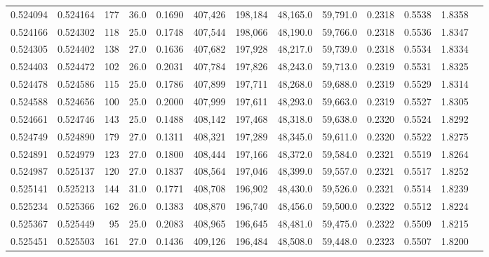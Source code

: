 \begin{tabular}{rrrrrrrrrrrrr}
0.524094 & 0.524164 &   177 & 36.0 &                                     0.1690 & 407,426 & 198,184 &  48,165.0 &  59,791.0 & 0.2318 & 0.5538 & 1.8358 \\
0.524166 & 0.524302 &   118 & 25.0 &                                     0.1748 & 407,544 & 198,066 &  48,190.0 &  59,766.0 & 0.2318 & 0.5536 & 1.8347 \\
0.524305 & 0.524402 &   138 & 27.0 &                                     0.1636 & 407,682 & 197,928 &  48,217.0 &  59,739.0 & 0.2318 & 0.5534 & 1.8334 \\
0.524403 & 0.524472 &   102 & 26.0 &                                     0.2031 & 407,784 & 197,826 &  48,243.0 &  59,713.0 & 0.2319 & 0.5531 & 1.8325 \\
0.524478 & 0.524586 &   115 & 25.0 &                                     0.1786 & 407,899 & 197,711 &  48,268.0 &  59,688.0 & 0.2319 & 0.5529 & 1.8314 \\
0.524588 & 0.524656 &   100 & 25.0 &                                     0.2000 & 407,999 & 197,611 &  48,293.0 &  59,663.0 & 0.2319 & 0.5527 & 1.8305 \\
0.524661 & 0.524746 &   143 & 25.0 &                                     0.1488 & 408,142 & 197,468 &  48,318.0 &  59,638.0 & 0.2320 & 0.5524 & 1.8292 \\
0.524749 & 0.524890 &   179 & 27.0 &                                     0.1311 & 408,321 & 197,289 &  48,345.0 &  59,611.0 & 0.2320 & 0.5522 & 1.8275 \\
0.524891 & 0.524979 &   123 & 27.0 &                                     0.1800 & 408,444 & 197,166 &  48,372.0 &  59,584.0 & 0.2321 & 0.5519 & 1.8264 \\
0.524987 & 0.525137 &   120 & 27.0 &                                     0.1837 & 408,564 & 197,046 &  48,399.0 &  59,557.0 & 0.2321 & 0.5517 & 1.8252 \\
0.525141 & 0.525213 &   144 & 31.0 &                                     0.1771 & 408,708 & 196,902 &  48,430.0 &  59,526.0 & 0.2321 & 0.5514 & 1.8239 \\
0.525234 & 0.525366 &   162 & 26.0 &                                     0.1383 & 408,870 & 196,740 &  48,456.0 &  59,500.0 & 0.2322 & 0.5512 & 1.8224 \\
0.525367 & 0.525449 &    95 & 25.0 &                                     0.2083 & 408,965 & 196,645 &  48,481.0 &  59,475.0 & 0.2322 & 0.5509 & 1.8215 \\
0.525451 & 0.525503 &   161 & 27.0 &                                     0.1436 & 409,126 & 196,484 &  48,508.0 &  59,448.0 & 0.2323 & 0.5507 & 1.8200 \\

\end{tabular}
